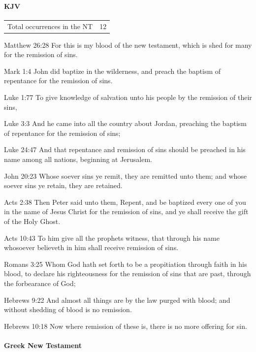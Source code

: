		\paragraph{KJV}
			\label{REMISSION-NT-KJV}
			
	
			\begin{tabular}{ll}
				Total occurrences in the NT & 12
			\end{tabular}
			
			\begin{compactdesc}
				\item[Matthew 26:28] For this is my blood of the new testament, which is shed for many for the remission of sins.
				\item[Mark 1:4] John did baptize in the wilderness, and preach the baptism of repentance for the remission of sins.
				\item[Luke 1:77] To give knowledge of salvation unto his people by the remission of their sins,
				\item[Luke 3:3] And he came into all the country about Jordan, preaching the baptism of repentance for the remission of sins;
				\item[Luke 24:47] And that repentance and remission of sins should be preached in his name among all nations, beginning at Jerusalem.
				\item[John 20:23] Whose soever sins ye remit, they are remitted unto them; and whose soever sins ye retain, they are retained.
				\item[Acts 2:38] Then Peter said unto them, Repent, and be baptized every one of you in the name of Jesus Christ for the remission of sins, and ye shall receive the gift of the Holy Ghost.
				\item[Acts 10:43] To him give all the prophets witness, that through his name whosoever believeth in him shall receive remission of sins.
				\item[Romans 3:25] Whom God hath set forth to be a propitiation through faith in his blood, to declare his righteousness for the remission of sins that are past, through the forbearance of God;
				\item[Hebrews 9:22] And almost all things are by the law purged with blood; and without shedding of blood is no remission.
				\item[Hebrews 10:18] Now where remission of these is, there is no more offering for sin.
			\end{compactdesc}
			
		\paragraph{Greek New Testament} %
			\label{REMISSION-GREEK}
		
